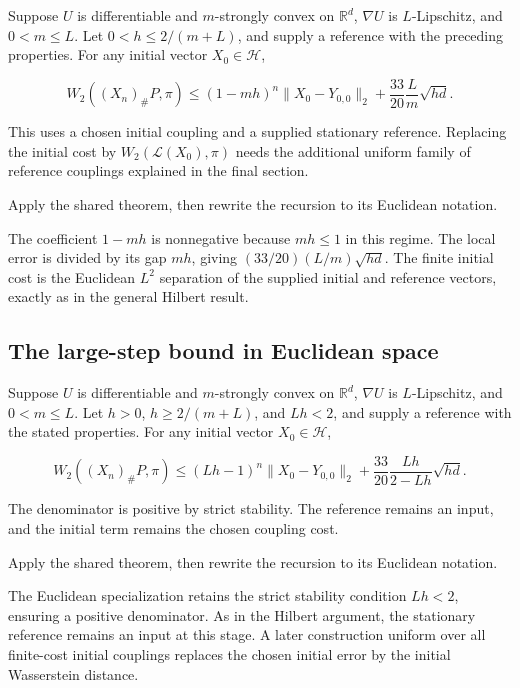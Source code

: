 \documentclass[11pt,a4paper]{report}
\begin{document}
Suppose \(U\) is differentiable and \(m\)-strongly convex on \(\mathbb R^d\), \(\nabla U\) is \(L\)-Lipschitz, and \(0<m\le L\). Let \(0<h\le2/(m+L)\), and supply a reference with the preceding properties. For any initial vector \(X_0\in\mathcal H\),

\[W_2((X_n)_\#P,\pi)\le(1-mh)^n\|X_0-Y_{0,0}\|_2+\frac{33}{20}\frac Lm\sqrt{hd}.\]

This uses a chosen initial coupling and a supplied stationary reference. Replacing the initial cost by \(W_2(\mathcal L(X_0),\pi)\) needs the additional uniform family of reference couplings explained in the final section.



Apply the shared theorem, then rewrite the recursion to its Euclidean notation.



The coefficient \(1-mh\) is nonnegative because \(mh\le1\) in this regime. The local error is divided by its gap \(mh\), giving \((33/20)(L/m)\sqrt{hd}\). The finite initial cost is the Euclidean \(L^2\) separation of the supplied initial and reference vectors, exactly as in the general Hilbert result.

\subsection{\texorpdfstring{The large-step bound in Euclidean space}{The large-step bound in Euclidean space}}
\label{report-step-UnadjustedLangevin-L2Convergence-lean-5}


Suppose \(U\) is differentiable and \(m\)-strongly convex on \(\mathbb R^d\), \(\nabla U\) is \(L\)-Lipschitz, and \(0<m\le L\). Let \(h>0\), \(h\ge2/(m+L)\), and \(Lh<2\), and supply a reference with the stated properties. For any initial vector \(X_0\in\mathcal H\),

\[W_2((X_n)_\#P,\pi)\le(Lh-1)^n\|X_0-Y_{0,0}\|_2+\frac{33}{20}\frac{Lh}{2-Lh}\sqrt{hd}.\]

The denominator is positive by strict stability. The reference remains an input, and the initial term remains the chosen coupling cost.



Apply the shared theorem, then rewrite the recursion to its Euclidean notation.



The Euclidean specialization retains the strict stability condition \(Lh<2\), ensuring a positive denominator. As in the Hilbert argument, the stationary reference remains an input at this stage. A later construction uniform over all finite-cost initial couplings replaces the chosen initial error by the initial Wasserstein distance.
\end{document}
